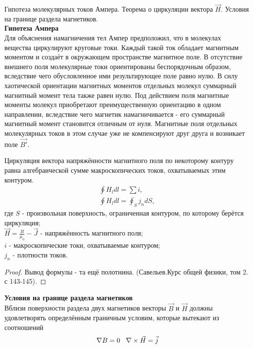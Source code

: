 \documentclass[__main__.tex]{subfiles}
\begin{document}
Гипотеза молекулярных токов Ампера. Теорема о циркуляции вектора $\vec{H}$. Условия на границе раздела магнетиков.\\ 
\textbf{Гипотеза Ампера}\\
Для объяснения намагничения тел Ампер предположил, что в молекулах вещества циркулируют круговые токи. Каждый такой ток обладает магнитным моментом и создаёт в окружающем пространстве магнитное поле. В отсутствие внешнего поля молекулярные токи ориентированы беспорядочным образом, вследствие чего обусловленное ими результирующее поле равно нулю. В силу хаотической ориентации магнитных моментов отдельных молекул суммарный магнитный момент тела также равен нулю. Под действием поля магнитные моменты молекул приобретают преимущественную ориентацию в одном направлении, вследствие чего магнетик намагничивается - его суммарный магнитный момент становится отличным от нуля. Магнитные поля отдельных молекулярных токов в этом случае уже не компенсируют друг друга и возникает поле $\vec{B'}$.
\begin{theorem}
	Циркуляция вектора напряжённости магнитного поля по некоторому контуру равна алгебраической сумме макроскопических токов, охватываемых этим контуром.
	\begin{gather}
	\oint{H_ldl} = \sum{i},
	\label{e-02-H1}\\
	\oint{H_ldl} = \oint_S{j_ndS},
	\label{e-02-H2}
	\end{gather}
	где 
	$S$ - произвольная поверхность, ограниченная контуром, по которому берётся циркуляция;\\
	$\vec{H} = \frac{B}{\mu_0} - \vec{J}$ - напряжённость магнитного поля;\\
	$i$ - макроскопические токи, охватываемые контуром;\\
	$j_n$ - плотности токов.
\end{theorem}
\begin{proof}
	Вывод формулы - та ещё полотнина. (Савельев.Курс общей физики, том 2. с 143-145).
\end{proof}
\textbf{Условия на границе раздела магнетиков}\\
Вблизи поверхности раздела двух магнетиков векторы $\vec{B}$ и $\vec{H}$ должны удовлетворять определённым граничным условим, которые вытекают из соотношений
\begin{gather}
\nabla B = 0 \hspace{0.3cm} \nabla\times \vec{H} = \vec{j}
\label{e-02-boundary} 
\end{gather}
\end{document}
